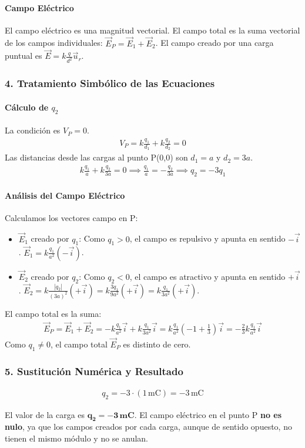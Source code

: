 \paragraph{Campo Eléctrico}
El campo eléctrico es una magnitud vectorial. El campo total es la suma vectorial de los campos individuales: $\vec{E}_P = \vec{E}_1 + \vec{E}_2$. El campo creado por una carga puntual es $\vec{E} = k\frac{q}{d^2}\vec{u}_r$.

\subsubsection*{4. Tratamiento Simbólico de las Ecuaciones}
\paragraph{Cálculo de $q_2$}
La condición es $V_P = 0$.
\begin{gather}
    V_P = k\frac{q_1}{d_1} + k\frac{q_2}{d_2} = 0
\end{gather}
Las distancias desde las cargas al punto P(0,0) son $d_1 = a$ y $d_2 = 3a$.
\begin{gather}
    k\frac{q_1}{a} + k\frac{q_2}{3a} = 0 \implies \frac{q_1}{a} = -\frac{q_2}{3a} \implies q_2 = -3q_1
\end{gather}
\paragraph{Análisis del Campo Eléctrico}
Calculamos los vectores campo en P:
\begin{itemize}
    \item $\vec{E}_1$ creado por $q_1$: Como $q_1>0$, el campo es repulsivo y apunta en sentido $-\vec{i}$. $\vec{E}_1 = k\frac{q_1}{a^2}(-\vec{i})$.
    \item $\vec{E}_2$ creado por $q_2$: Como $q_2<0$, el campo es atractivo y apunta en sentido $+\vec{i}$. $\vec{E}_2 = k\frac{|q_2|}{(3a)^2}(+\vec{i}) = k\frac{3q_1}{9a^2}(+\vec{i}) = k\frac{q_1}{3a^2}(+\vec{i})$.
\end{itemize}
El campo total es la suma:
\begin{gather}
    \vec{E}_P = \vec{E}_1 + \vec{E}_2 = -k\frac{q_1}{a^2}\vec{i} + k\frac{q_1}{3a^2}\vec{i} = k\frac{q_1}{a^2}\left(-1 + \frac{1}{3}\right)\vec{i} = -\frac{2}{3}k\frac{q_1}{a^2}\vec{i}
\end{gather}
Como $q_1 \neq 0$, el campo total $\vec{E}_P$ es distinto de cero.

\subsubsection*{5. Sustitución Numérica y Resultado}
\begin{gather}
    q_2 = -3 \cdot (1\,\text{mC}) = -3\,\text{mC}
\end{gather}
\begin{cajaresultado}
El valor de la carga es $\boldsymbol{q_2 = -3\,\textbf{mC}}$. El campo eléctrico en el punto P \textbf{no es nulo}, ya que los campos creados por cada carga, aunque de sentido opuesto, no tienen el mismo módulo y no se anulan.
\end{cajaresultado}

